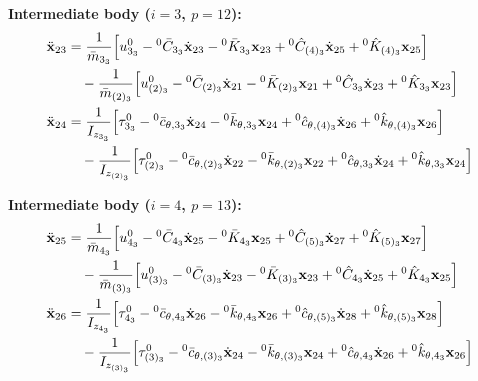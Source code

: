 \textbf{Intermediate body ($i=3$, $p=12$):}
\begin{align}
    \ddot{\mathbf{x}}_{23} &=
    \frac{1}{\bar{m}_{3_3}} \Big[ u^0_{3_3} - {}^0\bar{C}_{3_3}\dot{\mathbf{x}}_{23} - {}^0\bar{K}_{3_3}\mathbf{x}_{23} + {}^0\hat{C}_{(4)_3}\dot{\mathbf{x}}_{25} + {}^0\hat{K}_{(4)_3}\mathbf{x}_{25} \Big] \notag \\
    &\quad - \frac{1}{\bar{m}_{(2)_3}} \Big[ u^0_{(2)_3} - {}^0\bar{C}_{(2)_3}\dot{\mathbf{x}}_{21} - {}^0\bar{K}_{(2)_3}\mathbf{x}_{21} + {}^0\hat{C}_{3_3}\dot{\mathbf{x}}_{23} + {}^0\hat{K}_{3_3}\mathbf{x}_{23} \Big] \\
    \ddot{\mathbf{x}}_{24} &=
    \frac{1}{I_{z_{3_3}}} \Big[ \tau^0_{3_3} - {}^0\bar{c}_{\theta,3_3}\dot{\mathbf{x}}_{24} - {}^0\bar{k}_{\theta,3_3}\mathbf{x}_{24} + {}^0\hat{c}_{\theta,(4)_3}\dot{\mathbf{x}}_{26} + {}^0\hat{k}_{\theta,(4)_3}\mathbf{x}_{26} \Big] \notag \\
    &\quad - \frac{1}{I_{z_{(2)_3}}} \Big[ \tau^0_{(2)_3} - {}^0\bar{c}_{\theta,(2)_3}\dot{\mathbf{x}}_{22} - {}^0\bar{k}_{\theta,(2)_3}\mathbf{x}_{22} + {}^0\hat{c}_{\theta,3_3}\dot{\mathbf{x}}_{24} + {}^0\hat{k}_{\theta,3_3}\mathbf{x}_{24} \Big]
\end{align}

\textbf{Intermediate body ($i=4$, $p=13$):}
\begin{align}
    \ddot{\mathbf{x}}_{25} &=
    \frac{1}{\bar{m}_{4_3}} \Big[ u^0_{4_3} - {}^0\bar{C}_{4_3}\dot{\mathbf{x}}_{25} - {}^0\bar{K}_{4_3}\mathbf{x}_{25} + {}^0\hat{C}_{(5)_3}\dot{\mathbf{x}}_{27} + {}^0\hat{K}_{(5)_3}\mathbf{x}_{27} \Big] \notag \\
    &\quad - \frac{1}{\bar{m}_{(3)_3}} \Big[ u^0_{(3)_3} - {}^0\bar{C}_{(3)_3}\dot{\mathbf{x}}_{23} - {}^0\bar{K}_{(3)_3}\mathbf{x}_{23} + {}^0\hat{C}_{4_3}\dot{\mathbf{x}}_{25} + {}^0\hat{K}_{4_3}\mathbf{x}_{25} \Big] \\
    \ddot{\mathbf{x}}_{26} &=
    \frac{1}{I_{z_{4_3}}} \Big[ \tau^0_{4_3} - {}^0\bar{c}_{\theta,4_3}\dot{\mathbf{x}}_{26} - {}^0\bar{k}_{\theta,4_3}\mathbf{x}_{26} + {}^0\hat{c}_{\theta,(5)_3}\dot{\mathbf{x}}_{28} + {}^0\hat{k}_{\theta,(5)_3}\mathbf{x}_{28} \Big] \notag \\
    &\quad - \frac{1}{I_{z_{(3)_3}}} \Big[ \tau^0_{(3)_3} - {}^0\bar{c}_{\theta,(3)_3}\dot{\mathbf{x}}_{24} - {}^0\bar{k}_{\theta,(3)_3}\mathbf{x}_{24} + {}^0\hat{c}_{\theta,4_3}\dot{\mathbf{x}}_{26} + {}^0\hat{k}_{\theta,4_3}\mathbf{x}_{26} \Big]
\end{align}


